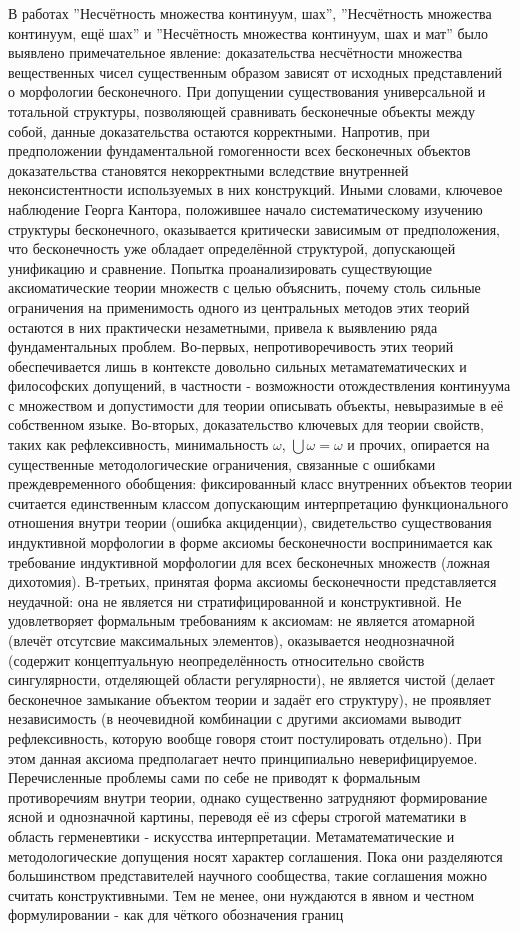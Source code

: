 \documentclass[12pt]{article}
\begin{document}
В работах ''Несчётность множества континуум, шах'', ''Несчётность множества континуум, ещё шах'' и ''Несчётность множества континуум, шах и мат'' было выявлено примечательное явление: доказательства несчётности множества вещественных чисел существенным образом зависят от исходных представлений о морфологии бесконечного. При допущении существования универсальной и тотальной структуры, позволяющей сравнивать бесконечные объекты между собой, данные доказательства остаются корректными. Напротив, при предположении фундаментальной гомогенности всех бесконечных объектов доказательства становятся некорректными вследствие внутренней неконсистентности используемых в них конструкций. Иными словами, ключевое наблюдение Георга Кантора, положившее начало систематическому изучению структуры бесконечного, оказывается критически зависимым от предположения, что бесконечность уже обладает определённой структурой, допускающей унификацию и сравнение. Попытка проанализировать существующие аксиоматические теории множеств с целью объяснить, почему столь сильные ограничения на применимость одного из центральных методов этих теорий остаются в них практически незаметными, привела к выявлению ряда фундаментальных проблем. Во-первых, непротиворечивость этих теорий обеспечивается лишь в контексте довольно сильных метаматематических и философских допущений, в частности - возможности отождествления континуума с множеством и допустимости для теории описывать объекты, невыразимые в её собственном языке. Во-вторых, доказательство ключевых для теории свойств, таких как рефлексивность, минимальность $\omega$, $\bigcup \omega = \omega$ и прочих, опирается на существенные методологические ограничения, связанные с ошибками преждевременного обобщения: фиксированный класс внутренних объектов теории считается единственным классом допускающим интерпретацию функционального отношения внутри теории (ошибка акциденции), свидетельство существования индуктивной морфологии в форме аксиомы бесконечности воспринимается как требование индуктивной морфологии для всех бесконечных множеств (ложная дихотомия). В-третьих, принятая форма аксиомы бесконечности представляется неудачной: она не является ни стратифицированной и конструктивной. Не удовлетворяет формальным требованиям к аксиомам: не является атомарной (влечёт отсутсвие максимальных элементов), оказывается неоднозначной (содержит концептуальную неопределённость относительно свойств сингулярности, отделяющей области регулярности), не является чистой (делает бесконечное замыкание объектом теории и задаёт его структуру), не проявляет независимость (в неочевидной комбинации с другими аксиомами выводит рефлексивность, которую вообще говоря стоит постулировать отдельно). При этом данная аксиома предполагает нечто принципиально неверифицируемое. Перечисленные проблемы сами по себе не приводят к формальным противоречиям внутри теории, однако существенно затрудняют формирование ясной и однозначной картины, переводя её из сферы строгой математики в область герменевтики - искусства интерпретации. Метаматематические и методологические допущения носят характер соглашения. Пока они разделяются большинством представителей научного сообщества, такие соглашения можно считать конструктивными. Тем не менее, они нуждаются в явном и честном формулировании - как для чёткого обозначения границ 
\end{document}
